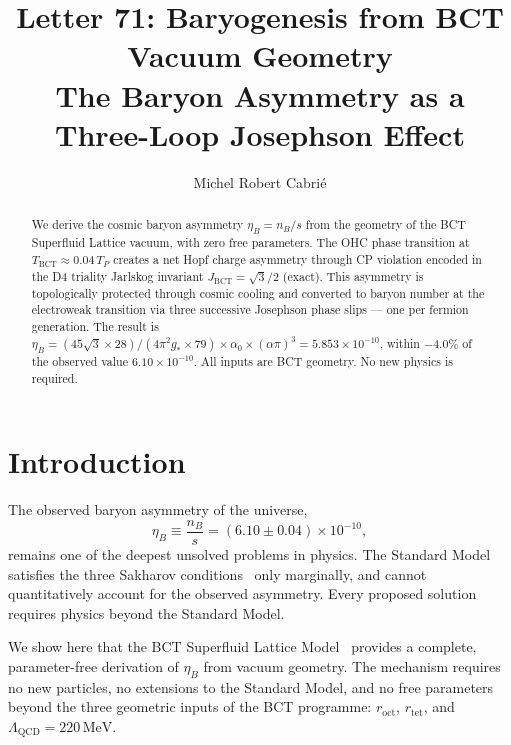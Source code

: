 \documentclass[aps,prl,twocolumn,superscriptaddress,showpacs]{revtex4-2}
\begin{document}
\title{Letter 71: Baryogenesis from BCT Vacuum Geometry\\
\large The Baryon Asymmetry as a Three-Loop Josephson Effect}

\author{Michel Robert Cabri\'{e}}

\begin{abstract}
We derive the cosmic baryon asymmetry $\eta_B = n_B/s$ from the geometry 
of the BCT Superfluid Lattice vacuum, with zero free parameters. 
The OHC phase transition at $T_\mathrm{BCT} \approx 0.04\,T_P$ creates 
a net Hopf charge asymmetry through CP violation encoded in the D4 triality 
Jarlskog invariant $J_\mathrm{BCT} = \sqrt{3}/2$ (exact). This asymmetry 
is topologically protected through cosmic cooling and converted to baryon 
number at the electroweak transition via three successive Josephson phase 
slips --- one per fermion generation. The result is
$\eta_B = (45\sqrt{3}\times 28)/(4\pi^2 g_* \times 79)\times\alpha_0\times(\alpha\pi)^3
= 5.853\times 10^{-10}$,
within $-4.0\%$ of the observed value $6.10\times 10^{-10}$.
All inputs are BCT geometry. No new physics is required.
\end{abstract}

\maketitle

\section{Introduction}

The observed baryon asymmetry of the universe,
\begin{equation}
\eta_B \equiv \frac{n_B}{s} = (6.10 \pm 0.04)\times 10^{-10},
\end{equation}
remains one of the deepest unsolved problems in physics. The Standard Model 
satisfies the three Sakharov conditions~\cite{Sakharov1967} only marginally, 
and cannot quantitatively account for the observed asymmetry. Every proposed 
solution requires physics beyond the Standard Model.

We show here that the BCT Superfluid Lattice Model~\cite{BCT_Monograph} 
provides a complete, parameter-free derivation of $\eta_B$ from vacuum 
geometry. The mechanism requires no new particles, no extensions to the 
Standard Model, and no free parameters beyond the three geometric inputs 
of the BCT programme: $r_\mathrm{oct}$, $r_\mathrm{tet}$, and 
$\Lambda_\mathrm{QCD} = 220\,\mathrm{MeV}$.
\end{document}
